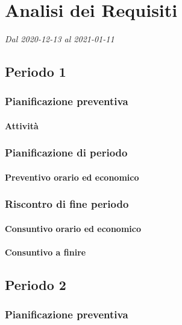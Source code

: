 \section{Analisi dei Requisiti}
\textit{Dal 2020-12-13 al 2021-01-11}




\subsection{Periodo 1}

\subsubsection{Pianificazione preventiva}

\paragraph{Attività}


\subsubsection{Pianificazione di periodo}



\paragraph{Preventivo orario ed economico}



\subsubsection{Riscontro di fine periodo}


\paragraph{Consuntivo orario ed economico}


\paragraph{Consuntivo a finire}



\subsection{Periodo 2}

\subsubsection{Pianificazione preventiva}


